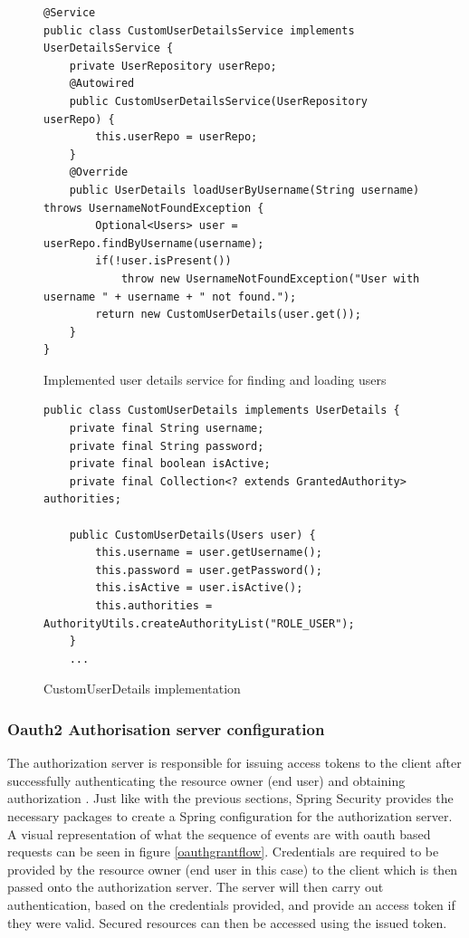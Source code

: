 \clearpage
\begin{figure}[ht]
    \centering
    \begin{lstlisting}
@Service
public class CustomUserDetailsService implements UserDetailsService {
    private UserRepository userRepo;
    @Autowired
    public CustomUserDetailsService(UserRepository userRepo) {
        this.userRepo = userRepo;
    }
    @Override
    public UserDetails loadUserByUsername(String username) throws UsernameNotFoundException {
        Optional<Users> user = userRepo.findByUsername(username);
        if(!user.isPresent())
            throw new UsernameNotFoundException("User with username " + username + " not found.");
        return new CustomUserDetails(user.get());
    }
}
    \end{lstlisting}
    \caption{Implemented user details service for finding and loading users}
    \label{userdetailsservice}
\end{figure}

\begin{figure}[ht]
    \centering
    \begin{lstlisting}
public class CustomUserDetails implements UserDetails {
    private final String username;
    private final String password;
    private final boolean isActive;
    private final Collection<? extends GrantedAuthority> authorities;

    public CustomUserDetails(Users user) {
        this.username = user.getUsername();
        this.password = user.getPassword();
        this.isActive = user.isActive();
        this.authorities = AuthorityUtils.createAuthorityList("ROLE_USER");
    }
    ...
    \end{lstlisting}
    \caption{CustomUserDetails implementation}
    \label{userdetailswrapper}
\end{figure}


\subsubsection{Oauth2 Authorisation server configuration}
The authorization server is responsible for issuing access tokens to the client after successfully authenticating the resource owner (end user)
and obtaining authorization \cite{hardt2012oauth}.
Just like with the previous sections, Spring Security provides the necessary packages to create a Spring configuration for the authorization
server.
A visual representation of what the sequence of events are with oauth based requests can be seen in figure \ref{oauthgrantflow}.
Credentials are required to be provided by the resource owner (end user in this case) to the client which is then passed onto the authorization
server.
The server will then carry out authentication, based on the credentials provided, and provide an access token if they were valid.
Secured resources can then be accessed using the issued token.

